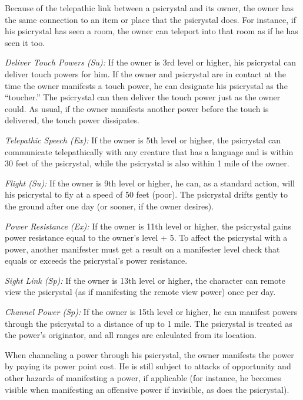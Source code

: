Because of the telepathic link between a psicrystal and its owner, the owner has the same connection to an item or place that the psicrystal does. For instance, if his psicrystal has seen a room, the owner can teleport into that room as if he has seen it too.

\textit{Deliver Touch Powers (Su):} If the owner is 3rd level or higher, his psicrystal can deliver touch powers for him. If the owner and psicrystal are in contact at the time the owner manifests a touch power, he can designate his psicrystal as the ``toucher.'' The psicrystal can then deliver the touch power just as the owner could. As usual, if the owner manifests another power before the touch is delivered, the touch power dissipates.

\textit{Telepathic Speech (Ex):} If the owner is 5th level or higher, the psicrystal can communicate telepathically with any creature that has a language and is within 30 feet of the psicrystal, while the psicrystal is also within 1 mile of the owner.

\textit{Flight (Su):} If the owner is 9th level or higher, he can, as a standard action, will his psicrystal to fly at a speed of 50 feet (poor). The psicrystal drifts gently to the ground after one day (or sooner, if the owner desires).

\textit{Power Resistance (Ex):} If the owner is 11th level or higher, the psicrystal gains power resistance equal to the owner's level + 5. To affect the psicrystal with a power, another manifester must get a result on a manifester level check that equals or exceeds the psicrystal's power resistance.

\textit{Sight Link (Sp):} If the owner is 13th level or higher, the character can remote view the psicrystal (as if manifesting the remote view power) once per day.

\textit{Channel Power (Sp):} If the owner is 15th level or higher, he can manifest powers through the psicrystal to a distance of up to 1 mile. The psicrystal is treated as the power's originator, and all ranges are calculated from its location.

When channeling a power through his psicrystal, the owner manifests the power by paying its power point cost. He is still subject to attacks of opportunity and other hazards of manifesting a power, if applicable (for instance, he becomes visible when manifesting an offensive power if invisible, as does the psicrystal).

